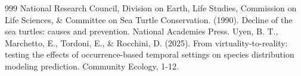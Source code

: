 \documentclass[12pt]{article}
\begin{document}
\begin{thebibliography}{999}
    National Research Council, Division on Earth, Life Studies, Commission on Life Sciences, \& Committee on Sea Turtle Conservation. (1990). Decline of the sea turtles: causes and prevention. National Academies Press.
%
    Uyen, B. T., Marchetto, E., Tordoni, E., \& Rocchini, D. (2025). From virtuality-to-reality: testing the effects of occurrence-based temporal settings on species distribution modeling prediction. Community Ecology, 1-12.
\end{thebibliography}
\end{document}
